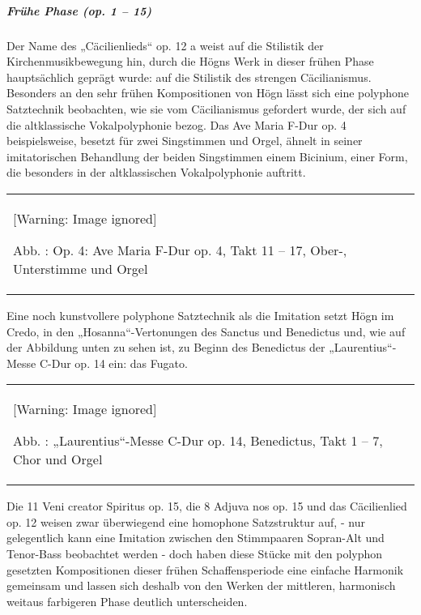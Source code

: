 \documentclass[a4paper]{article}
\newcounter{Abb}
\renewcommand\theAbb{\arabic{Abb}}
\begin{document}
\subparagraph{Frühe Phase (op. 1 – 15)}
Der Name des „Cäcilienlieds“ op. 12 a weist auf die Stilistik der
Kirchenmusikbewegung hin, durch die Högns Werk in dieser frühen Phase
hauptsächlich geprägt wurde: auf die Stilistik des strengen
Cäcilianismus. Besonders an den sehr frühen Kompositionen von Högn
lässt sich eine polyphone Satztechnik beobachten, wie sie vom
Cäcilianismus gefordert wurde, der sich auf die altklassische
Vokalpolyphonie bezog. Das Ave Maria F-Dur op. 4 beispielsweise,
besetzt für zwei Singstimmen und Orgel, ähnelt in seiner imitatorischen
Behandlung der beiden Singstimmen einem Bicinium, einer Form, die
besonders in der altklassischen Vokalpolyphonie auftritt.

\begin{center}
\tablefirsthead{}
\tablehead{}
\tabletail{}
\tablelasttail{}
\begin{supertabular}{m{11.565001cm}}
  [Warning: Image ignored] %
 
Abb. \stepcounter{Abb}{\theAbb}: Op. 4: Ave Maria F-Dur op. 4, Takt 11 –
17, Ober-, Unterstimme und Orgel\\
\end{supertabular}
\end{center}
Eine noch kunstvollere polyphone Satztechnik als die Imitation setzt
Högn im Credo, in den „Hosanna“-Vertonungen des Sanctus und Benedictus
und, wie auf der Abbildung unten zu sehen ist, zu Beginn des Benedictus
der „Laurentius“-Messe C-Dur op. 14 ein: das Fugato. 

\begin{center}
\tablefirsthead{}
\tablehead{}
\tabletail{}
\tablelasttail{}
\begin{supertabular}{m{11.948cm}}
  [Warning: Image ignored] %
 
Abb. \stepcounter{Abb}{\theAbb}: „Laurentius“-Messe C-Dur op. 14,
Benedictus, Takt 1 – 7, Chor und Orgel\\
\end{supertabular}
\end{center}
Die 11 Veni creator Spiritus op. 15, die 8 Adjuva nos op. 15 und das
Cäcilienlied op. 12 weisen zwar überwiegend eine homophone Satzstruktur
auf, - nur gelegentlich kann eine Imitation zwischen den Stimmpaaren
Sopran-Alt und Tenor-Bass beobachtet werden - doch haben diese Stücke
mit den polyphon gesetzten Kompositionen dieser frühen Schaffensperiode
eine einfache Harmonik gemeinsam und lassen sich deshalb von den Werken
der mittleren, harmonisch weitaus farbigeren Phase deutlich
unterscheiden.
\end{document}
